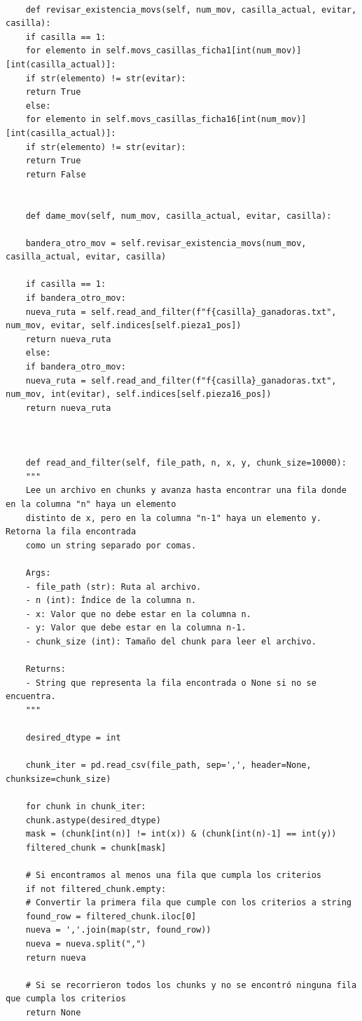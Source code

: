 \documentclass[11pt]{article} %
\begin{document}
\begin{lstlisting}
	
	def revisar_existencia_movs(self, num_mov, casilla_actual, evitar, casilla):
	if casilla == 1:
	for elemento in self.movs_casillas_ficha1[int(num_mov)][int(casilla_actual)]:
	if str(elemento) != str(evitar):
	return True
	else:
	for elemento in self.movs_casillas_ficha16[int(num_mov)][int(casilla_actual)]:
	if str(elemento) != str(evitar):
	return True
	return False
	
	
	def dame_mov(self, num_mov, casilla_actual, evitar, casilla):
	
	bandera_otro_mov = self.revisar_existencia_movs(num_mov, casilla_actual, evitar, casilla)
	
	if casilla == 1:
	if bandera_otro_mov:
	nueva_ruta = self.read_and_filter(f"f{casilla}_ganadoras.txt", num_mov, evitar, self.indices[self.pieza1_pos])
	return nueva_ruta
	else:
	if bandera_otro_mov:
	nueva_ruta = self.read_and_filter(f"f{casilla}_ganadoras.txt", num_mov, int(evitar), self.indices[self.pieza16_pos])
	return nueva_ruta
	
	
	
	def read_and_filter(self, file_path, n, x, y, chunk_size=10000):
	"""
	Lee un archivo en chunks y avanza hasta encontrar una fila donde en la columna "n" haya un elemento 
	distinto de x, pero en la columna "n-1" haya un elemento y. Retorna la fila encontrada 
	como un string separado por comas.
	
	Args:
	- file_path (str): Ruta al archivo.
	- n (int): Índice de la columna n.
	- x: Valor que no debe estar en la columna n.
	- y: Valor que debe estar en la columna n-1.
	- chunk_size (int): Tamaño del chunk para leer el archivo.
	
	Returns:
	- String que representa la fila encontrada o None si no se encuentra.
	"""
	
	desired_dtype = int
	
	chunk_iter = pd.read_csv(file_path, sep=',', header=None, chunksize=chunk_size)
	
	for chunk in chunk_iter:
	chunk.astype(desired_dtype)
	mask = (chunk[int(n)] != int(x)) & (chunk[int(n)-1] == int(y))
	filtered_chunk = chunk[mask]
	
	# Si encontramos al menos una fila que cumpla los criterios
	if not filtered_chunk.empty:
	# Convertir la primera fila que cumple con los criterios a string
	found_row = filtered_chunk.iloc[0]
	nueva = ','.join(map(str, found_row))
	nueva = nueva.split(",")
	return nueva
	
	# Si se recorrieron todos los chunks y no se encontró ninguna fila que cumpla los criterios
	return None
	

\end{lstlisting}
\end{document}
